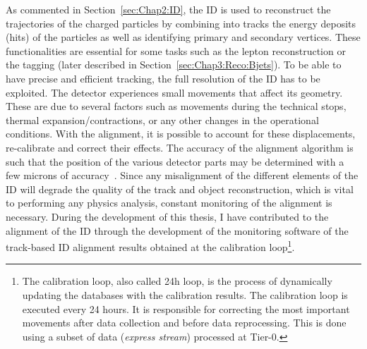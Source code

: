 As commented in Section~\ref{sec:Chap2:ID}, the ID is used to reconstruct the 
trajectories of the charged particles by combining into tracks the energy deposits
(hits) of the particles as well as identifying  primary and secondary vertices. 
These functionalities are essential for some tasks such as the lepton reconstruction
or the \bjet tagging (later described in Section~\ref{sec:Chap3:Reco:Bjets}). 
To be able to have precise and efficient tracking, the full resolution of the ID has to be exploited.
The detector experiences small movements that affect its geometry.
These are due to several factors such as movements during the technical stops, thermal 
expansion/contractions, %
or any other changes in the operational conditions.
With the alignment, it is possible to account for these displacements, re-calibrate and correct their effects. %
The accuracy of the alignment algorithm is such that the position of the various detector parts may be determined
with a few microns of accuracy~\cite{ATLAS:1999vwa}.  
Since any misalignment of the different elements of the ID will degrade the quality of the track and object reconstruction, 
which is vital to performing any physics analysis, constant monitoring of the alignment is necessary.
During the development of this thesis, I have contributed to the alignment of the ID through the
development of the monitoring software of the track-based ID alignment results obtained at the calibration 
loop\footnote{The calibration loop, also called 24h loop, is the process of dynamically updating the databases with the calibration results.
The calibration loop is executed every 24 hours. It is responsible for correcting the most important movements after data collection and before data reprocessing. This is done using a subset of data (\textit{express stream}) processed at Tier-0.}.


